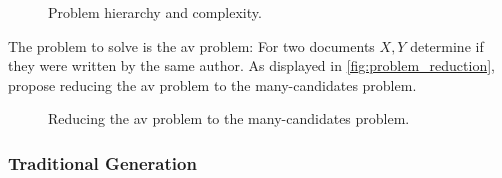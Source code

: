 \begin{figure}[htbp]
    \centering
    
    \caption{Problem hierarchy and complexity.}
    \label{fig:problem_hierarchy}
\end{figure}


The problem to solve is the \ac{av} problem:
For two documents $X, Y$ determine if they were written by the same author.
As displayed in \autoref{fig:problem_reduction}, \citet{koppel_determining_2014} propose reducing the \ac{av} problem to the many-candidates problem.

\begin{figure}[htbp]
    \centering
    
    \caption{Reducing the \ac{av} problem to the many-candidates problem.}
    \label{fig:problem_reduction}
\end{figure}


\subsubsection{Traditional \imp{} Generation}
\label{subsubsec:traditional_impostor_generation}

